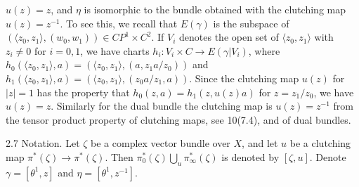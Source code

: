 $u(z) = z$, and $\eta$ is isomorphic to the bundle obtained with the clutching map $u(z) = z^{-1}$. To see this, we recall that $E(\gamma)$ is the subspace of $(\langle z_0, z_1 \rangle, (w_0, w_1)) \in CP^1 \times C^2$. If $V_i$ denotes the open set of $\langle z_0, z_1 \rangle$ with $z_i \neq 0$ for $i = 0, 1$, we have charts $h_i: V_i \times C \rightarrow E(\gamma|V_i)$, where $h_0(\langle z_0, z_1 \rangle, a) = (\langle z_0, z_1 \rangle, (a, z_1 a/z_0))$ and $h_1(\langle z_0, z_1 \rangle, a) = (\langle z_0, z_1 \rangle, (z_0 a/z_1, a))$. Since the clutching map $u(z)$ for $|z| = 1$ has the property that $h_0(z, a) = h_1(z, u(z)a)$ for $z = z_1/z_0$, we have $u(z) = z$. Similarly for the dual bundle the clutching map is $u(z) = z^{-1}$ from the tensor product property of clutching maps, see 10(7.4), and of dual bundles.

2.7 Notation. Let $\zeta$ be a complex vector bundle over $X$, and let $u$ be a clutching map $\pi^*(\zeta) \rightarrow \pi^*(\zeta)$. Then $\pi_0^*(\zeta) \bigcup_u \pi_\infty^*(\zeta)$ is denoted by $[\zeta, u]$. Denote $\gamma = [\theta^1, z]$ and $\eta = [\theta^1, z^{-1}]$.
